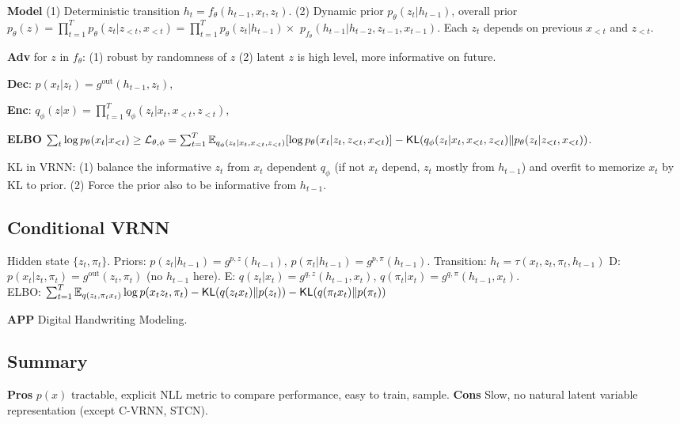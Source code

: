 \textbf{Model}
(1) Deterministic transition \(h_{t}=f_{\theta}(h_{t-1}, x_{t}, z_{t})\).
(2) Dynamic prior \(p_{\theta}(z_{t} | h_{t-1})\), overall prior \(p_{\theta}(z)=\prod_{t=1}^{T} p_{\theta}(z_{t}|z_{<t}, x_{<t}) = \prod_{t=1}^{T} p_{\theta}(z_{t} | h_{t-1})\times\) \( p_{f_\theta}(h_{t-1} | h_{t-2}, z_{t-1}, x_{t-1})\). Each $z_t$ depends on previous $x_{<t}$ and $z_{<t}$.

\textbf{Adv} for \(z\) in \(f_{\theta}\): (1) robust by randomness of \(z\) (2) latent \(z\) is high level, more informative on future.

\textbf{{Dec}}: \(p(x_{t} | z_{t})=g^{\text{out}}(h_{t-1}, z_{t})\),

\textbf{{Enc}}: \(q_{\phi}(z | x)=\prod_{t=1}^{T} q_{\phi}(z_{t} | x_{t}, x_{<t}, z_{<t})\),

\textbf{{ELBO}} \(\sum_t \log p_{\theta}(x_{t}|x_{< t}) \geq \mathcal{L}_{\theta, \phi}=\sum_{t=1}^{T} \mathbb{E}_{q_{\phi}(z_{t} | x_{t}, x_{<t}, z_{<t})}[\log p_{\theta}(x_{t} | z_{t}, z_{<t}, x_{<t})]-\operatorname{\mathsf{KL}}(q_{\phi}(z_{t} | x_{t}, x_{<t}, z_{<t}) \| p_{\theta}(z_{t} | z_{<t}, x_{<t}))\).

KL in VRNN: (1) balance the informative \(z_t\) from \(x_t\) dependent \(q_\phi\) (if not \(x_t\) depend, \(z_t\) mostly from \(h_{t-1}\)) and overfit to memorize \(x_t\) by KL to prior. (2) Force the prior also to be informative from \(h_{t-1}\).


\subsection*{Conditional VRNN}

Hidden state \(\{z_t, \pi_t\}\).
Priors: \(p(z_{t} | h_{t-1})=g^{p, z}(h_{t-1})\), \( p(\pi_{t} | h_{t-1})=g^{p, \pi}(h_{t-1})\).
Transition: \(h_{t}=\tau(x_{t}, z_{t}, \pi_{t}, h_{t-1})\)
\textsf{{D}}: \(p(x_{t} | z_{t}, \pi_{t})=g^{\text {out}}(z_{t}, \pi_{t})\) (no \(h_{t-1}\) here).
\textsf{{E}}: \(q(z_{t} | x_{t})=g^{q, z}(h_{t-1}, x_{t}) \), \( q(\pi_{t} | x_{t})=g^{q, \pi}(h_{t-1}, x_{t})\).\\
\textsf{{ELBO}}: \( \sum_{t=1}^{T} \mathbb{E}_{q(z_{t}, \pi_{t}  x_{t})} \log p(x_{t}  z_{t}, \pi_{t})- \operatorname{\mathsf{KL}} (q(z_{t}  x_{t}) \| p(z_{t})) - \operatorname{\mathsf{KL}}(q(\pi_{t}  x_{t}) \| p(\pi_{t}))\)

\textbf{APP} Digital Handwriting Modeling.

\subsection*{Summary}
\textbf{Pros} \(p(x)\) tractable, explicit NLL metric to compare performance, easy to train, sample.
\textbf{Cons} Slow, no natural latent variable representation (except C-VRNN, STCN).

